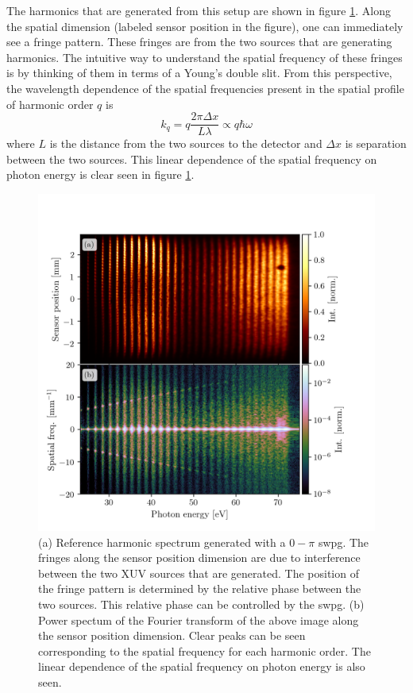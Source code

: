The harmonics that are generated from this setup are shown in figure \ref{fig:ref_img_pow_spec}. Along the spatial dimension (labeled sensor position in the figure), one can immediately see a fringe pattern.  These fringes are from the two sources that are generating harmonics.  The intuitive way to understand the spatial frequency of these fringes is by thinking of them in terms of a Young's double slit.  From this perspective, the wavelength dependence of the spatial frequencies present in the spatial profile of harmonic order $q$ is
\begin{equation}
	k_q=q\frac{2\pi \Delta x}{L \lambda}\propto q\hbar\omega
\end{equation} 
where $L$ is the distance from the two sources to the detector and $\Delta x$ is separation between the two sources.  This linear dependence of the spatial frequency on photon energy is clear seen in figure \ref{fig:ref_img_pow_spec}.
\begin{figure}
	\centering
	\includegraphics[width=1.0\textwidth]{figures/Two_source/ref_img_pow_spec.png}
	\caption{(a) Reference harmonic spectrum generated with a $0-\pi$ \gls{swpg}. The fringes along the sensor position dimension are due to interference between the two XUV sources that are generated.  The position of the fringe pattern is determined by the relative phase between the two sources.  This relative phase can be controlled by the \gls{swpg}. (b) Power spectum of the Fourier transform of the above image along the sensor position dimension. Clear peaks can be seen corresponding to the spatial frequency for each harmonic order.  The linear dependence of the spatial frequency on photon energy is also seen.}
	\label{fig:ref_img_pow_spec}
\end{figure}

